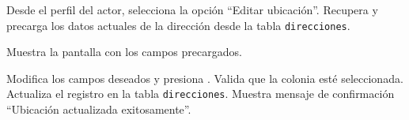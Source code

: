\begin{UCtrayectoria}
	\UCpaso[\UCactor] Desde el perfil del actor, selecciona la opción ``Editar ubicación''.
	\UCpaso Recupera y precarga los datos actuales de la dirección desde la tabla \texttt{direcciones}.
	
	\UCpaso Muestra la pantalla  con los campos precargados.
	
	
	\UCpaso[\UCactor] \label{CU-51.modificaUbicacion} Modifica los campos deseados y presiona .
	\UCpaso Valida que la colonia esté seleccionada. 
	\UCpaso Actualiza el registro en la tabla \texttt{direcciones}.
	\UCpaso Muestra mensaje de confirmación ``Ubicación actualizada exitosamente''.
\end{UCtrayectoria}

